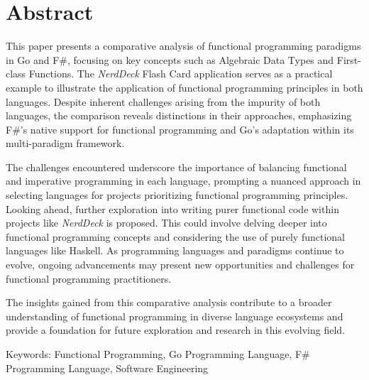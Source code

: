 \chapter*{Abstract}
\thispagestyle{empty}
This paper presents a comparative analysis of functional programming paradigms in Go and F\#, focusing on key concepts such as Algebraic Data Types and First-class Functions. The \textit{NerdDeck} Flash Card application serves as a practical example to illustrate the application of functional programming principles in both languages. Despite inherent challenges arising from the impurity of both languages, the comparison reveals distinctions in their approaches, emphasizing F\#'s native support for functional programming and Go's adaptation within its multi-paradigm framework.

The challenges encountered underscore the importance of balancing functional and imperative programming in each language, prompting a nuanced approach in selecting languages for projects prioritizing functional programming principles. Looking ahead, further exploration into writing purer functional code within projects like \textit{NerdDeck} is proposed. This could involve delving deeper into functional programming concepts and considering the use of purely functional languages like Haskell. As programming languages and paradigms continue to evolve, ongoing advancements may present new opportunities and challenges for functional programming practitioners.

The insights gained from this comparative analysis contribute to a broader understanding of functional programming in diverse language ecosystems and provide a foundation for future exploration and research in this evolving field.

\bigskip

\noindent
Keywords: Functional Programming, Go Programming Language, F\# Programming Language, Software Engineering

